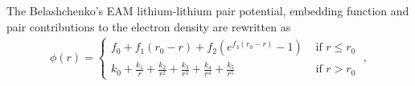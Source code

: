 \documentclass[jcp,amsmath,amssymb,preprint]{revtex4-1}
\begin{document}
The Belashchenko's EAM lithium-lithium pair potential, embedding function and pair contributions to the electron density are rewritten as
\begin{eqnarray}
    \phi(r) = \left\{
    \begin{array}{cc}
         f_0 + f_1(r_0-r) + f_2(e^{f_3(r_0-r)}-1) & \text{ if } r \leq r_0 \\
         \displaystyle k_0 + \frac{k_1}{r} + \frac{k_2}{r^2} + \frac{k_3}{r^3} + \frac{k_4}{r^4} + \frac{k_5}{r^5} & \text{ if } r>r_0  
    \end{array}\right. \;,
\end{eqnarray}


\end{document}
